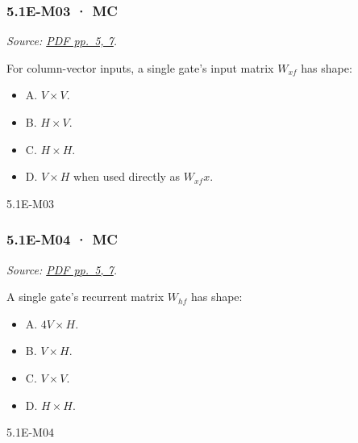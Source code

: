 \noindent\begin{minipage}{\linewidth}

\subsubsection{5.1E-M03 · MC}\label{e-m03-mc}

\emph{Source:
\href{../Lecture\%20Slides/5.1.\%20Extra\%20Material.pdf\#page=5}{PDF
pp.~5, 7}.}

For column-vector inputs, a single gate's input matrix \(W_{xf}\) has
shape:

\begin{itemize}
\tightlist
\item
  A. \(V\times V\).
\item
  B. \(H\times V\).
\item
  C. \(H\times H\).
\item
  D. \(V\times H\) when used directly as \(W_{xf}x\).
\end{itemize}

\begin{solution}[8mm]{5.1E-M03}

\end{solution}
\end{minipage}\par\medskip

\noindent\begin{minipage}{\linewidth}

\subsubsection{5.1E-M04 · MC}\label{e-m04-mc}

\emph{Source:
\href{../Lecture\%20Slides/5.1.\%20Extra\%20Material.pdf\#page=5}{PDF
pp.~5, 7}.}

A single gate's recurrent matrix \(W_{hf}\) has shape:

\begin{itemize}
\tightlist
\item
  A. \(4V\times H\).
\item
  B. \(V\times H\).
\item
  C. \(V\times V\).
\item
  D. \(H\times H\).
\end{itemize}

\begin{solution}[8mm]{5.1E-M04}

\end{solution}
\end{minipage}\par\medskip


